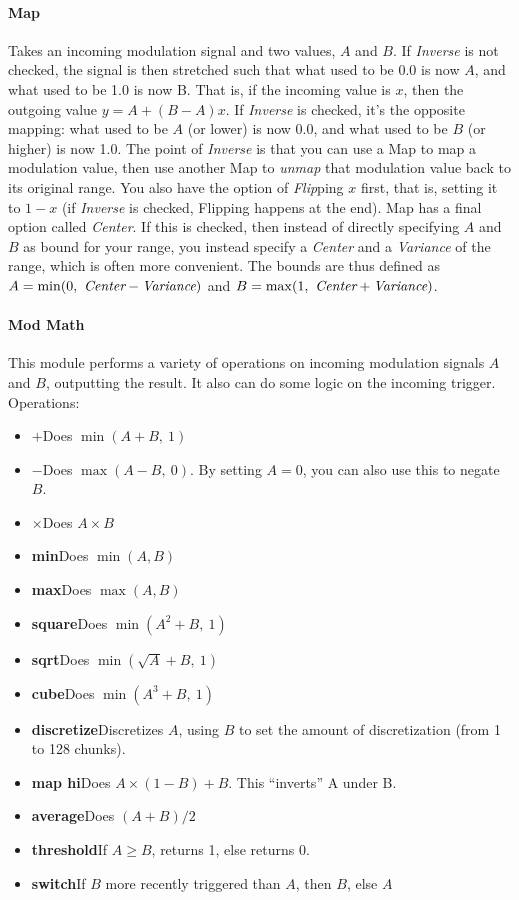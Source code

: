 \documentclass{article}
\begin{document}
\paragraph{Map}  Takes an incoming modulation signal and two values, \(A\) and \(B\).  If {\it Inverse} is not checked, the signal is then stretched such that what used to be 0.0 is now \(A\), and what used to be 1.0 is now B.  That is, if the incoming value is \(x\), then the outgoing value \(y = A + (B - A)x\).  If {\it Inverse} is checked, it's the opposite mapping: what used to be \(A\) (or lower) is now 0.0, and what used to be \(B\) (or higher) is now 1.0.  The point of {\it Inverse} is that you can use a Map to map a modulation value, then use another Map to {\it unmap} that modulation value back to its original range.  You also have the option of {\it Flip}ping \(x\) first, that is, setting it to \(1-x\) (if {\it Inverse} is checked, Flipping happens at the end).  Map has a final option called {\it Center}.  If this is checked, then instead of directly specifying \(A\) and \(B\) as bound for your range, you instead specify a {\it Center} and a {\it Variance} of the range, which is often more convenient.  The bounds are thus defined as \(A = \min(0,\ \text{\it Center} - \text{\it Variance})\) and \(B = \max(1,\ \text{\it Center} + \text{\it Variance})\).

\paragraph{Mod Math}  This module performs a variety of operations on incoming modulation signals \(A\) and \(B\), outputting the result.  It also can do some logic on the incoming trigger.  Operations:

\begin{itemize}
\item \(\boldsymbol{+}\)\quad Does \(\min(A + B,\ 1)\)
\item \(\boldsymbol -\)\quad Does \(\max(A - B,\ 0)\).  By setting \(A=0\), you can also use this to negate \(B\).
\item \(\boldsymbol \times\)\quad Does \(A \times B\)
\item {\bf min}\quad Does \(\min(A, B)\)
\item {\bf max}\quad Does \(\max(A, B)\)
\item {\bf square}\quad Does \(\min(A^2 + B,\ 1)\)
\item {\bf sqrt}\quad Does \(\min(\sqrt{A} + B,\ 1)\)
\item {\bf cube}\quad Does \(\min(A^3 + B,\ 1)\)
\item {\bf discretize}\quad Discretizes \(A\), using \(B\) to set the amount of discretization (from 1 to 128 chunks).
\item {\bf map hi}\quad Does \(A \times (1-B) + B\).  This ``inverts'' A under B.
\item {\bf average}\quad Does \((A + B) / 2\)
\item {\bf threshold}\quad If \(A \geq B\), returns 1, else returns 0.
\item {\bf switch}\quad If \(B\) more recently triggered than \(A\), then \(B\), else \(A\)
\end{itemize}
\end{document}
